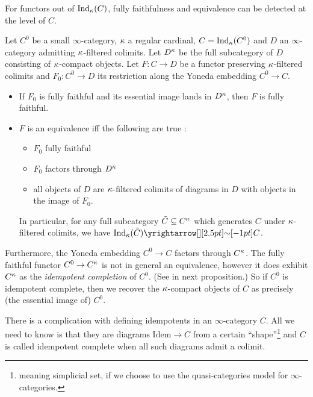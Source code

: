 \documentclass[./main.tex]{subfiles}
\begin{document}
For functors out of $\mathrm{Ind}_\kappa(C)$,
fully faithfulness and equivalence can be detected at the level of $C$.
\begin{prop}
  
  Let $C^0$ be a small $\infty$-category, $\kappa$ a regular cardinal,
  $C = \mathrm{Ind}_\kappa(C^0)$ and
  $D$ an $\infty$-category admitting $\kappa$-filtered colimits.
  Let $D^\kappa$ be the full subcategory of $D$ consisting of 
  $\kappa$-compact objects.
  Let $F : C \to D$ be a functor preserving $\kappa$-filtered colimits
  and $F_0 : C^0 \to D$ its restriction along 
  the Yoneda embedding $C^0 \to C$.
  \begin{itemize}
    \item If $F_0$ is fully faithful and its essential image lands in $D^\kappa$,
    then $F$ is fully faithful.
    \item $F$ is an equivalence iff the following are true :
    \begin{itemize}
      \item $F_0$ fully faithful
      \item $F_0$ factors through $D^\kappa$
      \item all objects of $D$ are $\kappa$-filtered colimits of diagrams
      in $D$ with objects in the image of $F_0$.
    \end{itemize}
    In particular,
    for any full subcategory $\tilde{C} \subseteq C^\kappa$ which
    generates $C$ under $\kappa$-filtered colimits,
    we have $\IND_\ka(\tilde{C}) \map{\sim}{} C$.
  \end{itemize}
  \cite[Prop 5.3.5.11]{Lurie-HTT}
\end{prop}

Furthermore, 
the Yoneda embedding $C^0 \to C$ factors through $C^\kappa$.
The fully faithful functor $C^0 \to C^\kappa$ is not in general an equivalence,
however it does exhibit $C^\kappa$ as the \emph{idempotent completion}
of $C^0$. (See in next proposition.)
So if $C^0$ is idempotent complete, 
then we recover the $\kappa$-compact objects of $C$ as precisely 
(the essential image of) $C^0$.

There is a complication with defining idempotents in an $\infty$-category $C$.
All we need to know is that 
they are diagrams $\mathrm{Idem} \to C$ from a certain ``shape''\footnote{
  meaning simplicial set, if we choose to use the quasi-categories
  model for $\infty$-categories. 
}
and $C$ is called idempotent complete when
all such diagrams admit a colimit.
\end{document}
